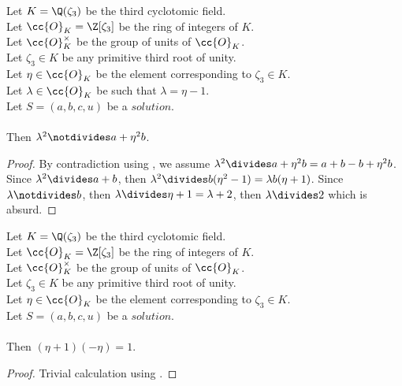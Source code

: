 \begin{lemma}
  \label{lmm:lambda_sq_not_dvd_a_add_eta_sq_mul_b}
  \leanok
  Let $K = \Q(\zeta_3)$ be the third cyclotomic field. \\
  Let $\cc{O}_K = \Z[\zeta_3]$ be the ring of integers of $K$. \\
  Let $\cc{O}^\times_K$ be the group of units of $\cc{O}_K$. \\
  Let $\zeta_3 \in K$ be any primitive third root of unity. \\
  Let $\eta \in \cc{O}_K$ be the element corresponding to $\zeta_3 \in K$. \\
  Let $\lambda \in \cc{O}_K$ be such that $\lambda = \eta -1$. \\
  Let $S=(a, b, c, u)$ be a $solution$.\\\\
  Then $\lambda^2 \notdivides a + \eta^2  b$.
\end{lemma}
\begin{proof}
  \leanok
  By contradiction using , we assume
  $\lambda^2 \divides a +\eta^2 b = a + b -b + \eta^2  b$.
  Since $\lambda^2 \divides a+b$, then $\lambda^2 \divides b (\eta^2 -1)
  = \lambda b (\eta + 1)$. Since $\lambda \notdivides b$, then
  $\lambda \divides \eta+1 = \lambda +2$, then $\lambda \divides 2$ which is absurd.
\end{proof}

\begin{lemma}
  \label{lmm:eta_add_one_inv}
  \leanok
  Let $K = \Q(\zeta_3)$ be the third cyclotomic field. \\
  Let $\cc{O}_K = \Z[\zeta_3]$ be the ring of integers of $K$. \\
  Let $\cc{O}^\times_K$ be the group of units of $\cc{O}_K$. \\
  Let $\zeta_3 \in K$ be any primitive third root of unity. \\
  Let $\eta \in \cc{O}_K$ be the element corresponding to $\zeta_3 \in K$. \\
  Let $S=(a, b, c, u)$ be a $solution$.\\\\
  Then $(\eta + 1)  (-\eta) = 1$.
\end{lemma}
\begin{proof}
  \leanok
  Trivial calculation using .
\end{proof}

